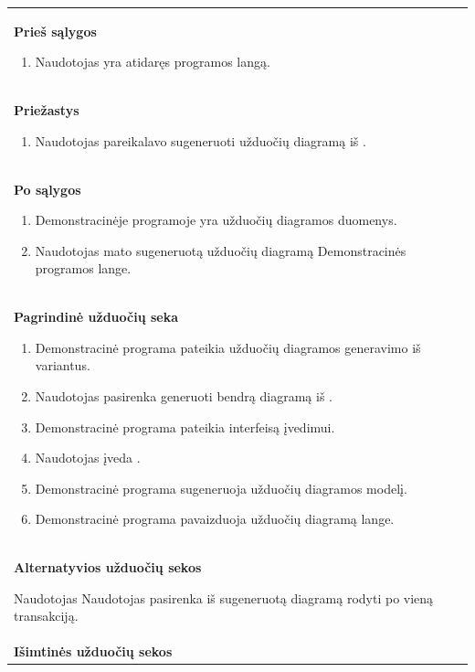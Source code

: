 \begin{center}
\begin{longtable}{|p{\textwidth}|}
    \\
    \textbf{Prieš sąlygos}
    \begin{enumerate}
    	\item Naudotojas yra atidaręs programos langą.
	\end{enumerate}
    \\
    \textbf{Priežastys}
    \begin{enumerate}
    	\item Naudotojas pareikalavo sugeneruoti užduočių diagramą iš \DVCM{}.
	\end{enumerate}
    \\
    \textbf{Po sąlygos}
    \begin{enumerate}
    	\item Demonstracinėje programoje yra užduočių diagramos duomenys.
      \item Naudotojas mato sugeneruotą užduočių diagramą Demonstracinės programos lange.
	\end{enumerate}
    \\
    \textbf{Pagrindinė užduočių seka}
    \begin{enumerate}
      \item Demonstracinė programa pateikia užduočių diagramos generavimo iš \DVCM{} variantus.
      \item Naudotojas pasirenka generuoti bendrą diagramą iš \DVCM{}. \label{seka:re_generate_choose_way}
    	\item Demonstracinė programa pateikia interfeisą \DVCM{} įvedimui.
    	\item Naudotojas įveda \DVCM{}.
      \item Demonstracinė programa sugeneruoja užduočių diagramos modelį.
      \item Demonstracinė programa pavaizduoja užduočių diagramą lange.
	\end{enumerate}
    \\
    \textbf{Alternatyvios užduočių sekos}
			\newlist{seka}{enumerate}{3}
			\setlist[seka]{label*=\arabic*.,leftmargin=2em}
			\setlist[seka,1]{label=\ref{seka:re_generate_choose_way}.\arabic*.,leftmargin=2em}
			\begin{seka}
					\item Naudotojas Naudotojas pasirenka iš \DVCM{} sugeneruotą diagramą rodyti po vieną transakciją.
			\end{seka}
    \\
    \textbf{Išimtinės užduočių sekos}
			\newlist{seka}{enumerate}{3}
			\setlist[seka]{label*=\arabic*.,leftmargin=2em}

\end{longtable}
\end{center}
